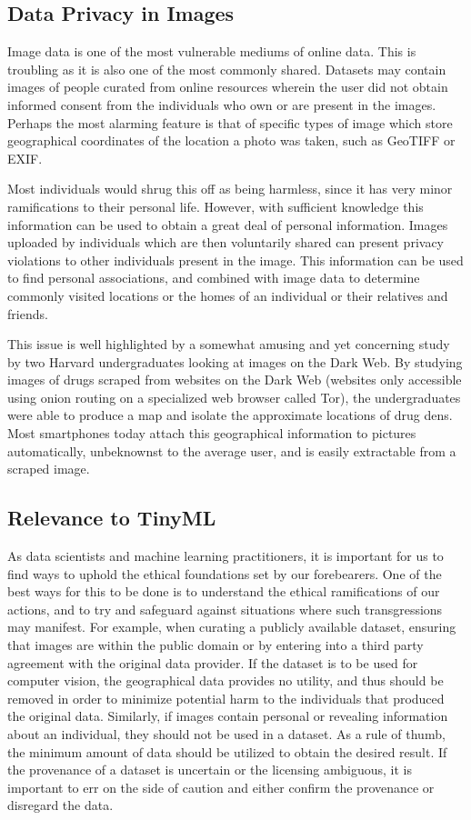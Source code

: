   \subsection{Data Privacy in Images}
  
  Image data is one of the most vulnerable mediums of online data. This is troubling as it is also one of the most commonly shared. Datasets may contain images of people curated from online resources wherein the user did not obtain informed consent from the individuals who own or are present in the images. Perhaps the most alarming feature is that of specific types of image which store geographical coordinates of the location a photo was taken, such as GeoTIFF or EXIF.
  
  Most individuals would shrug this off as being harmless, since it has very minor ramifications to their personal life. However, with sufficient knowledge this information can be used to obtain a great deal of personal information. Images uploaded by individuals which are then voluntarily shared can present privacy violations to other individuals present in the image. This information can be used to find personal associations, and combined with image data to determine commonly visited locations or the homes of an individual or their relatives and friends.
  
  This issue is well highlighted by a somewhat amusing and yet concerning study by two Harvard undergraduates looking at images on the Dark Web. By studying images of drugs scraped from websites on the Dark Web (websites only accessible using onion routing on a specialized web browser called Tor), the undergraduates were able to produce a map and isolate the approximate locations of drug dens. Most smartphones today attach this geographical information to pictures automatically, unbeknownst to the average user, and is easily extractable from a scraped image. 
  
  \subsection{Relevance to TinyML}
  
  As data scientists and machine learning practitioners, it is important for us to find ways to uphold the ethical foundations set by our forebearers. One of the best ways for this to be done is to understand the ethical ramifications of our actions, and to try and safeguard against situations where such transgressions may manifest. For example, when curating a publicly available dataset, ensuring that images are within the public domain or by entering into a third party agreement with the original data provider. If the dataset is to be used for computer vision, the geographical data provides no utility, and thus should be removed in order to minimize potential harm to the individuals that produced the original data. Similarly, if images contain personal or revealing information about an individual, they should not be used in a dataset. As a rule of thumb, the minimum amount of data should be utilized to obtain the desired result. If the provenance of a dataset is uncertain or the licensing ambiguous, it is important to err on the side of caution and either confirm the provenance or disregard the data.
  

